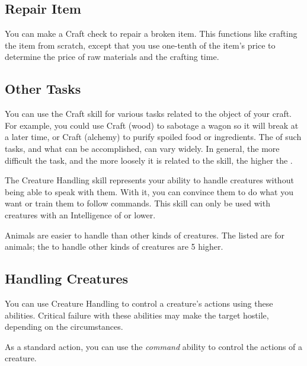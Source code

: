     \subsection{Repair Item}
        You can make a Craft check to repair a broken item. This functions like crafting the item from scratch, except that you use one-tenth of the item's price to determine the price of raw materials and the crafting time.

    \subsection{Other Tasks}
        You can use the Craft skill for various tasks related to the object of your craft. For example, you could use Craft (wood) to sabotage a wagon so it will break at a later time, or Craft (alchemy) to purify spoiled food or ingredients. The  of such tasks, and what can be accomplished, can vary widely. In general, the more difficult the task, and the more loosely it is related to the skill, the higher the .

\newpage
{}
    The Creature Handling skill represents your ability to handle creatures without being able to speak with them. With it, you can convince them to do what you want or train them to follow commands. This skill can only be used with creatures with an Intelligence of  or lower.

        Animals are easier to handle than other kinds of creatures.
        The  listed are for animals; the  to handle other kinds of creatures are 5 higher.

    \subsection{Handling Creatures}
        You can use Creature Handling to control a creature's actions using these abilities.
        Critical failure with these abilities may make the target hostile, depending on the circumstances.

        As a standard action, you can use the \textit{command} ability to control the actions of a creature.

